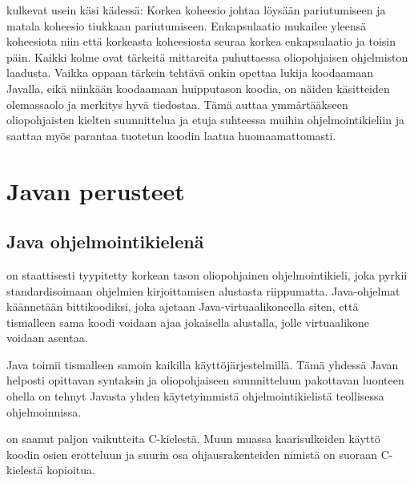 \documentclass{tufte-book}
\begin{document}
 kulkevat usein käsi kädessä: Korkea koheesio johtaa löysään
pariutumiseen ja matala koheesio tiukkaan pariutumiseen. Enkapsulaatio mukailee yleensä koheesiota
niin että korkeasta koheesiosta seuraa korkea enkapsulaatio ja toisin päin. Kaikki kolme ovat
tärkeitä mittareita puhuttaessa oliopohjaisen ohjelmiston laadusta. Vaikka oppaan tärkein tehtävä
onkin opettaa lukija koodaamaan Javalla, eikä niinkään koodaamaan huipputason koodia, on näiden
käsitteiden olemassaolo ja merkitys hyvä tiedostaa. Tämä auttaa ymmärtääkseen oliopohjaisten
kielten suunnittelua ja etuja suhteessa muihin ohjelmointikieliin ja saattaa myös parantaa
tuotetun koodin laatua huomaamattomasti.


\chapter{Javan perusteet}
\label{perusteet}	

\section{Java ohjelmointikielenä}
\label{javasta}

 on staattisesti tyypitetty korkean tason oliopohjainen ohjelmointikieli, joka
pyrkii standardisoimaan ohjelmien kirjoittamisen alustasta riippumatta. Java-ohjelmat käännetään
bittikoodiksi, joka ajetaan Java-virtuaalikoneella siten, että tismalleen sama koodi voidaan ajaa
jokaisella alustalla, jolle virtuaalikone voidaan asentaa.

 Java toimii tismalleen samoin kaikilla käyttöjärjestelmillä. Tämä
yhdessä Javan helposti opittavan syntaksin ja oliopohjaiseen suunnitteluun pakottavan luonteen
ohella on tehnyt Javasta yhden käytetyimmistä ohjelmointikielistä teollisessa ohjelmoinnissa.

 on saanut paljon vaikutteita C-kielestä. Muun muassa kaarisulkeiden
käyttö koodin osien erotteluun ja suurin osa ohjausrakenteiden nimistä on suoraan C-kielestä
kopioitua.

\end{document}
